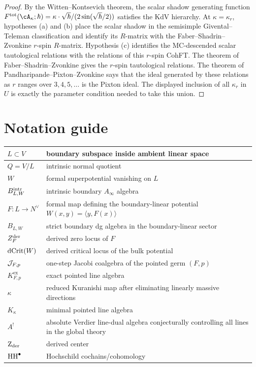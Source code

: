 \begin{proof}
By the Witten--Kontsevich theorem, the scalar shadow
generating function
$F^{\mathrm{tot}}(\cA_{\kappa}; \hbar) = \kappa \cdot
\sqrt{\hbar}/(2\sin(\sqrt{\hbar}/2))$ satisfies the KdV hierarchy.
At $\kappa=\kappa_r$, hypotheses \textup{(a)} and \textup{(b)}
place the scalar shadow in the semisimple Givental--Teleman
classification and identify its $R$-matrix with the
Faber--Shadrin--Zvonkine $r$-spin $R$-matrix.  Hypothesis
\textup{(c)} identifies the MC-descended scalar tautological
relations with the relations of this $r$-spin CohFT.  The theorem of
Faber--Shadrin--Zvonkine gives the $r$-spin tautological relations.
The theorem of Pandharipande--Pixton--Zvonkine says that the ideal
generated by these relations as $r$ ranges over $3,4,5,\ldots$ is
the Pixton ideal.  The displayed inclusion of all $\kappa_r$ in $U$
is exactly the parameter condition needed to take this union.
\end{proof}


\appendix

\section{Notation guide}

\begin{center}
\renewcommand{\arraystretch}{1.2}
\begin{longtable}{|p{}|p{}|}
\hline
$L\subset V$ & boundary subspace inside ambient linear space \\
\hline
$Q=V/L$ & intrinsic normal quotient \\
\hline
$W$ & formal superpotential vanishing on $L$ \\
\hline
$B^{\mathrm{intr}}_{L,W}$ & intrinsic boundary $A_\infty$ algebra \\
\hline
$F:L\to N^\vee$ & formal map defining the boundary-linear potential $W(x,y)=\langle y,F(x)\rangle$ \\
\hline
$B_{L,W}$ & strict boundary dg algebra in the boundary-linear sector \\
\hline
$Z_F^{\mathrm{der}}$ & derived zero locus of $F$ \\
\hline
$\operatorname{dCrit}(W)$ & derived critical locus of the bulk potential \\
\hline
$\mathcal J_{F,p}$ & one-step Jacobi coalgebra of the pointed germ $(F,p)$ \\
\hline
$K^{\mathrm{ex}}_{F,p}$ & exact pointed line algebra \\
\hline
$\kappa$ & reduced Kuranishi map after eliminating linearly massive directions \\
\hline
$K_\kappa$ & minimal pointed line algebra \\
\hline
$A^!$ & absolute Verdier line-dual algebra conjecturally controlling all lines in the global theory \\
\hline
$\operatorname{Z}_{\mathrm{der}}$ & derived center \\
\hline
$\operatorname{HH}^\bullet$ & Hochschild cochains/cohomology \\
\hline
\end{longtable}
\end{center}

